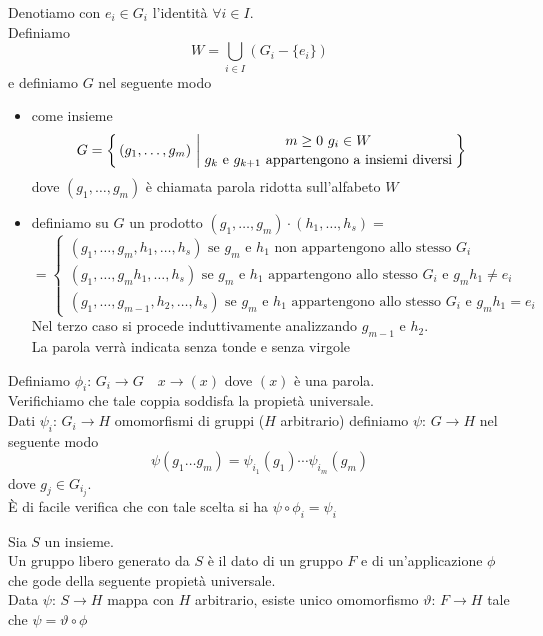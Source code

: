 \begin{prop}\bianco
\proof Denotiamo con $e_i \in G_i$ l'identit\`a $\forall i \in I$.\\
Definiamo $$W=\bigcup_{i\in I} ( G_i - \{e_i\})$$
e definiamo $G$ nel seguente modo
\begin{itemize}
\item come insieme
$$ G=\left\{\, (g_1, \dots, g_m) \, \left\vert \,
{ {m\geq 0\, \,  g_i \in W }\atop{ g_k\text{ e } g_{k+1} \text{ appartengono a insiemi diversi}}}\right.\right\}$$
dove $(g_1, \dots, g_m)$ \`e chiamata parola ridotta sull'alfabeto $W$
\item definiamo su $G$ un prodotto
$ (g_1,\dots, g_m)\cdot(h_1,\dots,h_s)= $ $$=\begin{cases} (g_1,\dots, g_m,h_1,\dots,h_s)  \text{ se } g_m \text{ e } h_1 \text{ non appartengono allo stesso } G_i\\
(g_1,\dots, g_mh_1,\dots,h_s)  \text{ se } g_m \text{ e } h_1 \text{ appartengono allo stesso } G_i \text{ e } g_m h_1\neq e_i \\
(g_1,\dots, g_{m-1},h_2,\dots,h_s)  \text{ se } g_m \text{ e } h_1 \text{ appartengono allo stesso } G_i \text{ e } g_m h_1= e_i 
\end{cases}$$
Nel terzo caso si procede induttivamente analizzando $g_{m-1}$ e $h_2$.\\
La parola verr\`a indicata senza tonde e senza virgole 
\end{itemize}
Definiamo 
$\phi_i:\, G_i \to G \quad x \to (x)$ dove $(x)$ \`e una parola.\\
Verifichiamo che tale coppia soddisfa la propiet\`a universale.\\
Dati $\psi_i:\, G_i \to H $ omomorfismi di gruppi  ($H$ arbitrario) definiamo $\psi:\, G \to H $ nel seguente modo
$$ \psi(g_1\dots g_m)=\psi_{i_1}(g_1) \cdots \psi_{i_m}(g_m)$$
dove $g_j \in G_{i_j}$.\\
\`E di facile verifica che con tale scelta si ha $\psi \circ \phi_i=\psi_i$
\endproof
\end{prop}
\begin{defn}\bianco
Sia $S$ un insieme.\\
Un gruppo libero generato da $S$ \`e il dato di un gruppo $F$ e di un'applicazione $\phi$ che gode della seguente propiet\`a universale.\\
Data $\psi:\, S \to H$ mappa con $H$ arbitrario, esiste unico omomorfismo $\vartheta:\, F \to H$ tale che $\psi=\vartheta \circ \phi$
\end{defn}
